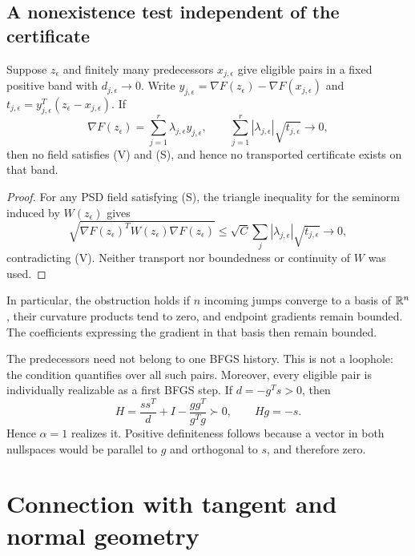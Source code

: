 

\subsection{A nonexistence test independent of the certificate}

\begin{proposition}\label{G:prop:star}
Suppose $z_\epsilon$ and finitely many predecessors $x_{j,\epsilon}$ give eligible pairs in a fixed positive band with $d_{j,\epsilon}\to0$. Write $y_{j,\epsilon}=\nabla F(z_\epsilon)-\nabla F(x_{j,\epsilon})$ and $t_{j,\epsilon}=y_{j,\epsilon}^T(z_\epsilon-x_{j,\epsilon})$. If
\[
 \nabla F(z_\epsilon)=\sum_{j=1}^r\lambda_{j,\epsilon}y_{j,\epsilon},
 \qquad
 \sum_{j=1}^r|\lambda_{j,\epsilon}|\sqrt{t_{j,\epsilon}}\longrightarrow0,
\]
then no field satisfies (V) and (S), and hence no transported certificate exists on that band.
\end{proposition}
\begin{proof}
For any PSD field satisfying (S), the triangle inequality for the seminorm induced by $W(z_\epsilon)$ gives
\[
 \sqrt{\nabla F(z_\epsilon)^TW(z_\epsilon)\nabla F(z_\epsilon)}
 \le\sqrt C\sum_j|\lambda_{j,\epsilon}|\sqrt{t_{j,\epsilon}}\to0,
\]
contradicting (V). Neither transport nor boundedness or continuity of $W$ was used.
\end{proof}
In particular, the obstruction holds if $n$ incoming jumps converge to a basis of $\mathbb R^n$, their curvature products tend to zero, and endpoint gradients remain bounded. The coefficients expressing the gradient in that basis then remain bounded.

The predecessors need not belong to one BFGS history. This is not a loophole: the condition quantifies over all such pairs. Moreover, every eligible pair is individually realizable as a first BFGS step. If $d=-g^Ts>0$, then
\[
 H=\frac{ss^T}{d}+I-\frac{gg^T}{g^Tg}\succ0,\qquad Hg=-s.
\]
Hence $\alpha=1$ realizes it. Positive definiteness follows because a vector in both nullspaces would be parallel to $g$ and orthogonal to $s$, and therefore zero.


\setcounter{section}{3}
\setcounter{theorem}{0}
\setcounter{equation}{4}


\section{Connection with tangent and normal geometry}

